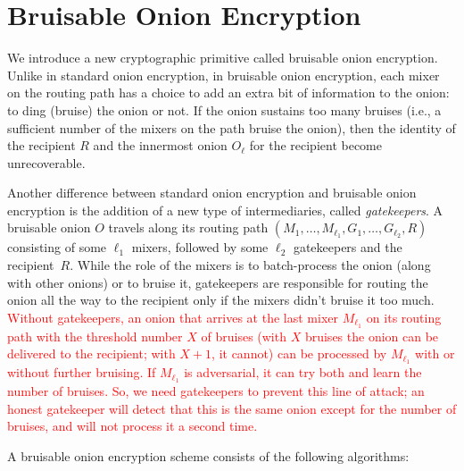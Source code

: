 \section{Bruisable Onion Encryption} \label{sec:definitions}
We introduce a new cryptographic primitive called bruisable onion encryption. Unlike in standard onion encryption, in bruisable onion encryption, each mixer on the routing path has a choice to add an extra bit of information to the onion: to ding (bruise) the onion or not. If the onion sustains too many bruises (i.e., a sufficient number of the mixers on the path bruise the onion), then the identity of the recipient $R$ and the innermost onion $O_\ell$ for the recipient become unrecoverable. 

Another difference between standard onion encryption and bruisable onion encryption is the addition of a new type of intermediaries, called \emph{gatekeepers}. 
A bruisable onion $O$ travels along its routing path $(M_1, \dots, M_{\ell_1}, G_1, \dots, G_{\ell_2}, R)$ consisting of some $\ell_1$ mixers, followed by some $\ell_2$ gatekeepers and the recipient~$R$. While the role of the mixers is to batch-process the onion (along with other onions) or to bruise it, gatekeepers are responsible for routing the onion all the way to the recipient only if the mixers didn't bruise it too much. 
\textcolor{red}{
Without gatekeepers, an onion that arrives at the last mixer $M_{\ell_1}$ on its routing path with the threshold number $X$ of bruises (with $X$ bruises the onion can be delivered to the recipient; with $X+1$, it cannot) can be processed by $M_{\ell_1}$ with or without further bruising. If $M_{\ell_1}$ is adversarial, it can try both and learn the number of bruises. So, we need gatekeepers to prevent this line of attack; an honest gatekeeper will detect that this is the same onion except for the number of bruises, and will not process it a second time. %
}

A bruisable onion encryption scheme %
consists of the following algorithms:  


